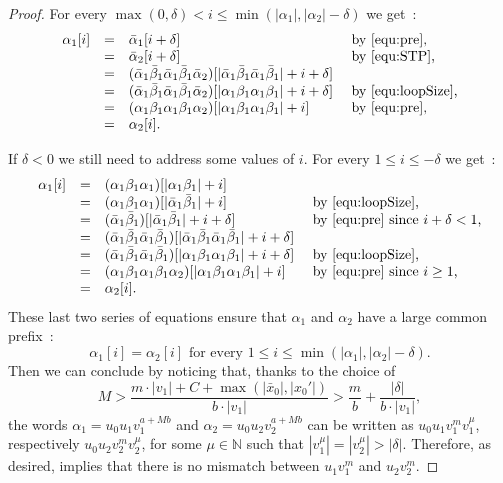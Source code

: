 \documentclass[a4paper,UKenglish,cleveref, autoref, thm-restate,authorcolumns, colorlinks]{lipics-v2021}
\begin{document}
\begin{proof}
For every $\max(0,\delta) < i \leq \min(|\alpha_1|,|\alpha_2|-\delta)$ we get~:
\[
\begin{array}{llll}
    \alpha_1[i]
    & = & \bar{\alpha}_1[i + \delta] & \text{ by~\eqref{equ:pre},}\\
    & = & \bar{\alpha}_2[i + \delta] & \text{ by~\eqref{equ:STP},}\\
    & = & (\bar{\alpha}_1
    \bar{\beta}_1 \bar{\alpha}_1
    \bar{\beta}_1 \bar{\alpha}_2)[|\bar{\alpha}_1
    \bar{\beta}_1\bar{\alpha}_1
    \bar{\beta}_1| + i + \delta] & \\
    & = & (\bar{\alpha}_1
    \bar{\beta}_1\bar{\alpha}_1
    \bar{\beta}_1 \bar{\alpha}_2)[|\alpha_1 \beta_1\alpha_1 \beta_1| + i + \delta] & \text{ by~\eqref{equ:loopSize},}\\
    & = & (\alpha_1 \beta_1\alpha_1 \beta_1 \alpha_2)[|\alpha_1 \beta_1\alpha_1 \beta_1| + i] & \text{ by~\eqref{equ:pre},}\\
    & = & \alpha_2[i].
\end{array}
\]

If $\delta < 0$ we still need to address some values of $i$. 
For every $1 \leq i \leq -\delta$ we get~:
\[
\begin{array}{llll}
    \alpha_1[i]
    & = & (\alpha_1 \beta_1 \alpha_1)[|\alpha_1 \beta_1| + i]\\
    & = & (\alpha_1 \beta_1 \alpha_1)[|\bar{\alpha}_1 \bar{\beta}_1| + i] & \text{ by~\eqref{equ:loopSize},}\\
    & = & (\bar{\alpha}_1 \bar{\beta}_1)[|\bar{\alpha}_1 \bar{\beta}_1| + i + \delta] & \text{ by~\eqref{equ:pre} since $i + \delta < 1$,}\\
    & = & (\bar{\alpha}_1 \bar{\beta}_1\bar{\alpha}_1 \bar{\beta}_1)[
    |\bar{\alpha}_1 \bar{\beta}_1\bar{\alpha}_1 \bar{\beta}_1| + i + \delta] \\
    & = & (\bar{\alpha}_1 \bar{\beta}_1\bar{\alpha}_1 \bar{\beta}_1)[|\alpha_1 \beta_1\alpha_1 \beta_1| + i + \delta] & \text{ by~\eqref{equ:loopSize},}\\
    & = & (\alpha_1 \beta_1 \alpha_1 \beta_1 \alpha_2)[|\alpha_1 \beta_1\alpha_1 \beta_1| + i] & \text{ by~\eqref{equ:pre} since $i \geq 1$,}\\
    & = & \alpha_2[i].
\end{array}
\]
These last two series of equations ensure that $\alpha_1$ and $\alpha_2$
have a large common prefix~:
\begin{equation}\label{equ:fin}
    \alpha_1[i] = \alpha_2[i] \text{ for every } 1 \leq i \leq \min(|\alpha_1|,|\alpha_2|-\delta).
\end{equation}
Then we can conclude by noticing that, thanks to the choice of 
\[
M > \frac{m \cdot |v_1| + C + \max(|\bar{x}_0|,|x_0'|)}{b \cdot |v_1|} > 
\frac{m}{b} + \frac{|\delta|}{b \cdot |v_1|},
\]
the words $\alpha_1 = u_0u_1v_1^{a + Mb}$ and $\alpha_2 = u_0u_2v_2^{a + Mb}$
can be written
as $u_0u_1v_1^{m}v_1^{\mu}$, respectively $u_0u_2v_2^{m}v_2^{\mu}$,
for some $\mu \in \mathbb{N}$ such that $|v_1^{\mu}| = |v_2^{\mu}| > |\delta|$.
Therefore, as desired,  implies that there is no mismatch between 
 $u_1v_1^m$ and $u_2v_2^m$.





\end{proof}
\end{document}
